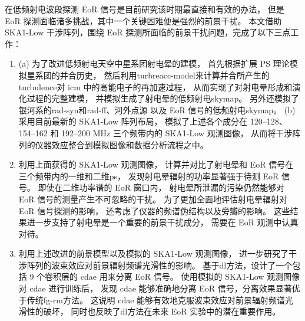 
\begin{summary}

在低频射电波段探测 EoR 信号是目前研究该时期最直接和有效的办法，
但是 EoR 探测面临诸多挑战，其中一个关键困难便是强烈的前景干扰。
本文借助 SKA1-Low 干涉阵列，围绕 EoR 探测所面临的前景干扰问题，完成了以下三点工作：
\begin{enumerate}
\item
(a) 为了改进低频射电天空中星系团射电晕的建模，
首先根据扩展 \ac{PS} 理论模拟星系团的并合历史，
然后利用\ac{turbreacc-model}来计算并合所产生的\ac{turbulence}对 \ac{icm}
中的高能电子的再加速过程，
从而实现了对射电晕形成和演化过程的完整建模，
并模拟生成了射电晕的低频射电\ac{skymap}。
另外还模拟了银河系的\ac{rad-syn}和\ac{rad-ff}、河外点源
以及 EoR 信号的低频射电\ac{skymap}。
(b) 采用目前最新的 SKA1-Low 阵列布局，
模拟了上述各个成分在 \numrange{120}{128}、\numrange{154}{162}
和 \numrange{192}{200} \si{\MHz} 三个频带内的 SKA1-Low 观测图像，
从而将干涉阵列的仪器效应整合到模拟图像和数据分析流程之中。

\item
利用上面获得的 SKA1-Low 观测图像，
计算并对比了射电晕和 EoR 信号在三个频带内的一维和二维\ac{ps}，
发现射电晕辐射的功率显著强于待测 EoR 信号。
即使在二维功率谱的 EoR 窗口内，
射电晕所泄漏的污染仍然能够对 EoR 信号的测量产生不可忽略的干扰。
为了更加全面地评估射电晕辐射对 EoR 信号探测的影响，
还考虑了仪器的频谱伪结构以及旁瓣的影响。
这些结果进一步支持了射电晕是一个重要的前景干扰成分，
需要在 EoR 观测中认真对待。

\item
利用上述改进的前景模型以及模拟的 SKA1-Low 观测图像，
进一步研究了干涉阵列的波束效应对前景辐射频谱光滑性的影响。
基于\ac{dl}方法，设计了一个包括 9 个卷积层的 \ac{cdae} 用来分离 EoR 信号。
使用模拟的 SKA1-Low 观测图像对 \ac{cdae} 进行训练后，
发现 \ac{cdae} 能够准确地分离 EoR 信号，分离效果显著优于传统\ac{fg-rm}方法。
这说明 \ac{cdae} 能够有效地克服波束效应对前景辐射频谱光滑性的破坏，
同时也反映了\ac{dl}方法在未来 EoR 实验中的潜在重要作用。
\end{enumerate}



\end{summary}
